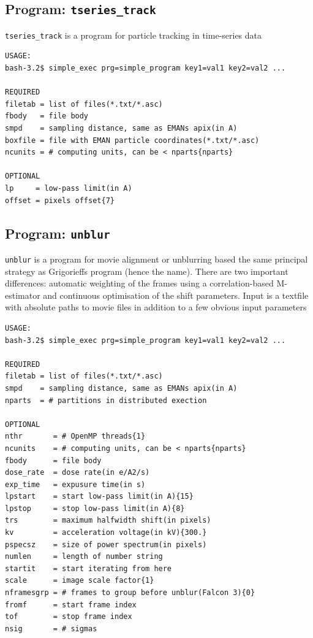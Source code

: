 \documentclass[a4paper,11pt]{article}
\newcommand{\prgname}[1]{\textcolor{NavyBlue}{\texttt{#1}}}
\begin{document}
\subsection{Program: \prgname{tseries\_track}}
\label{tseries_track}
\prgname{tseries\_track} is a program for particle tracking in time-series data 

\begin{verbatim}
USAGE:
bash-3.2$ simple_exec prg=simple_program key1=val1 key2=val2 ...

REQUIRED
filetab = list of files(*.txt/*.asc)
fbody   = file body
smpd    = sampling distance, same as EMANs apix(in A)
boxfile = file with EMAN particle coordinates(*.txt/*.asc)
ncunits = # computing units, can be < nparts{nparts}

OPTIONAL
lp     = low-pass limit(in A)
offset = pixels offset{7}
\end{verbatim}

\subsection{Program: \prgname{unblur}}
\label{unblur}
\prgname{unblur} is a program for movie alignment or unblurring based the same principal strategy as Grigorieffs program (hence the name). There are two important differences: automatic weighting of the frames using a correlation-based M-estimator and continuous optimisation of the shift parameters. Input is a textfile with absolute paths to movie files in addition to a few obvious input parameters

\begin{verbatim}
USAGE:
bash-3.2$ simple_exec prg=simple_program key1=val1 key2=val2 ...

REQUIRED
filetab = list of files(*.txt/*.asc)
smpd    = sampling distance, same as EMANs apix(in A)
nparts  = # partitions in distributed exection

OPTIONAL
nthr       = # OpenMP threads{1}
ncunits    = # computing units, can be < nparts{nparts}
fbody      = file body
dose_rate  = dose rate(in e/A2/s)
exp_time   = expusure time(in s)
lpstart    = start low-pass limit(in A){15}
lpstop     = stop low-pass limit(in A){8}
trs        = maximum halfwidth shift(in pixels)
kv         = acceleration voltage(in kV){300.}
pspecsz    = size of power spectrum(in pixels)
numlen     = length of number string
startit    = start iterating from here
scale      = image scale factor{1}
nframesgrp = # frames to group before unblur(Falcon 3){0}
fromf      = start frame index
tof        = stop frame index
nsig       = # sigmas
\end{verbatim}
\end{document}
